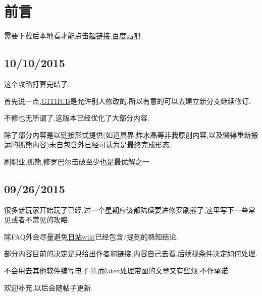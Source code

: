 \newpage

\section{前言}

需要下载后本地看才能点击\href{https://github.com/KindleIsNotKind/Disgaea_5_How_To}{超链接},\href{http://tieba.baidu.com/f?kw=%E9%AD%94%E7%95%8C%E6%88%98%E8%AE%B0&ie=utf-8}{百度贴吧}.

\subsection{10/10/2015}

这个攻略打算完结了.

首先说一点,\href{https://github.com/KindleIsNotKind/Disgaea_5_How_To}{GITHUB}是允许别人修改的,所以有意的可以去建立新分支继续修订.

不修也无所谓了,这版本已经优化了大部分内容.

除了部分内容是以链接形式提供(如道具界,炸水晶等非我原创内容,以及懒得重新搬运的抓熊内容)未自包含外已经可认为是最终完成形态.

刷职业,抓熊,修罗巴尔击破至少也是最优解之一.

\subsection{09/26/2015}

很多新玩家开始玩了已经,过一个星期应该都陆续要进修罗刷熊了,这里写下一些常见或者不常见的攻略.

{\color{red}{本文建立在有魔女DLC和暴君DLC的基础之上}}

除FAQ外会尽量避免\href{http://wikinavi.net/disgaea5/index.php}{日站wiki}已经包含/提到的熟知结论.

部分内容目前的决定是只给出作者和链接,内容自己去看,后续视条件决定如何处理.

不会用去其他软件编写电子书,而latex处理带图的文章又有些烦,不作承诺.

欢迎补充,以后会随帖子更新.

\newpage

